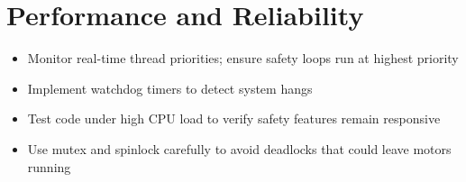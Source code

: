 \section{Performance and Reliability}

\begin{itemize}
    \item Monitor real-time thread priorities; ensure safety loops run at highest priority
    \item Implement watchdog timers to detect system hangs
    \item Test code under high CPU load to verify safety features remain responsive
    \item Use mutex and spinlock carefully to avoid deadlocks that could leave motors running
\end{itemize}





